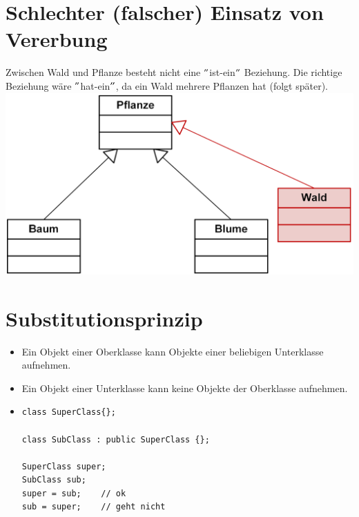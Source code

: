 \section{Schlechter (falscher) Einsatz von Vererbung}
Zwischen Wald und Pflanze besteht nicht eine $"$ist-ein$"$ Beziehung. Die richtige Beziehung wäre $"$hat-ein$"$, da ein Wald mehrere Pflanzen hat (folgt später).\\
\includegraphics[width=0.5\linewidth]{images/vererbung5.png}

\section{Substitutionsprinzip}
\begin{itemize}
	\item Ein Objekt einer Oberklasse kann Objekte einer beliebigen Unterklasse aufnehmen.
	\item Ein Objekt einer Unterklasse kann keine Objekte der Oberklasse aufnehmen.
	\item[\-]
	\vspace{-\baselineskip}
	\begin{minipage}{0.5\linewidth}
\begin{lstlisting}
class SuperClass{}; 

class SubClass : public SuperClass {};

SuperClass super;
SubClass sub;
super = sub; 	// ok
sub = super;	// geht nicht
\end{lstlisting}
	\end{minipage}
\end{itemize}












